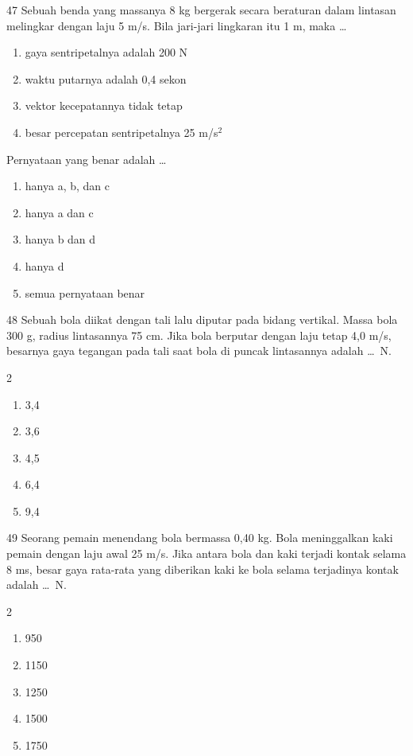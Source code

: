 \documentclass[11pt]{article}
\newenvironment{pil}{%
  \begin{enumerate}[label=(\Alph*),leftmargin=*,itemsep=1pt,topsep=3pt]}%
  {\end{enumerate}}
\newenvironment{pilB}{%
  \par\smallskip\begin{multicols}{2}
  \begin{enumerate}[label=(\Alph*),leftmargin=*,itemsep=1pt,topsep=3pt]}%
  {\end{enumerate}\end{multicols}}
\begin{document}
\begin{soal}{47}
Sebuah benda yang massanya 8 kg bergerak secara beraturan dalam lintasan
melingkar dengan laju 5 m/s. Bila jari-jari lingkaran itu 1 m, maka
\ldots
\begin{enumerate}[label=\alph*.,leftmargin=*,itemsep=2pt,topsep=3pt]
  \item gaya sentripetalnya adalah 200 N
  \item waktu putarnya adalah 0,4 sekon
  \item vektor kecepatannya tidak tetap
  \item besar percepatan sentripetalnya 25 m/s$^2$
\end{enumerate}
Pernyataan yang benar adalah \ldots
\begin{pil}
  \item hanya a, b, dan c \item hanya a dan c \item hanya b dan d
  \item hanya d \item semua pernyataan benar
\end{pil}
\end{soal}

\begin{soal}{48}
Sebuah bola diikat dengan tali lalu diputar pada bidang vertikal. Massa
bola 300 g, radius lintasannya 75 cm. Jika bola berputar dengan laju
tetap 4,0 m/s, besarnya gaya tegangan pada tali saat bola di puncak
lintasannya adalah \ldots\ N.
\begin{pilB}
  \item 3,4 \item 3,6 \item 4,5 \item 6,4 \item 9,4
\end{pilB}
\end{soal}

\begin{soal}{49}
Seorang pemain menendang bola bermassa 0,40 kg. Bola meninggalkan kaki
pemain dengan laju awal 25 m/s. Jika antara bola dan kaki terjadi kontak
selama 8 ms, besar gaya rata-rata yang diberikan kaki ke bola selama
terjadinya kontak adalah \ldots\ N.
\begin{pilB}
  \item 950 \item 1150 \item 1250 \item 1500 \item 1750
\end{pilB}
\end{soal}
\end{document}
